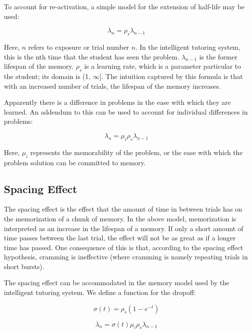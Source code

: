 To account for re-activation, a simple model for the extension of half-life
may be used: 

\begin{equation}
\label{eq:ebbinghaus}
 \lambda_n = \rho_s \lambda_{n-1}
\end{equation}

Here, $n$ refers to exposure or trial number $n$.  In the intelligent tutoring
system, this is the nth time that the student has seen the problem.
$\lambda_{n-1}$ is the former lifespan of the memory.  $\rho_s$ is a learning
rate, which is a parameter particular to the student; its domain is (1,
$\infty$].  The intuition captured by this formula is that with an increased
number of trials, the lifespan of the memory increases.

Apparently there is a difference in problems in the ease with which they are
learned.  An addendum to this can be used to account for individual differences
in problems: 

\begin{equation}
\label{eq:ebbinghaus}
 \lambda_n = \mu_i \rho_s \lambda_{n-1}
\end{equation}

Here, $\mu_i$ represents the memorability of the problem, or the ease with
which the problem solution can be committed to memory. 



\subsection{Spacing Effect}

The spacing effect is the effect that the amount of time in between trials has
on the memorization of a chunk of memory.  In the above model, memorization is
interpreted as an increase in the lifespan of a memory.  If only a short amount
of time passes between the last trial, the effect will not be as great as if a
longer time has passed.  One consequence of this is that, according to the
spacing effect hypothesis, cramming is ineffective (where cramming is namely
repeating trials in short bursts).

The spacing effect can be accommodated in the memory model used by the
intelligent tutoring system.  We define a function for the dropoff:

\begin{equation}
  \label{eq:spacing}
  \sigma(t) = \rho_s(1 - e^{-t})
\end{equation}

\begin{equation}
\label{eq:ebbinghaus}
 \lambda_n = \sigma(t) \mu_i \rho_s \lambda_{n-1}
\end{equation}


